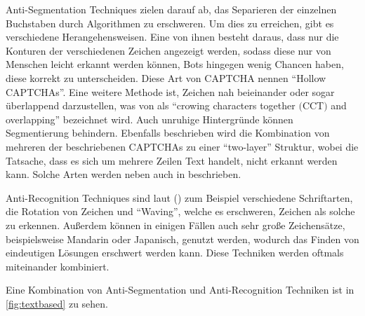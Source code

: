 Anti-Segmentation Techniques zielen darauf ab, das Separieren der einzelnen Buchstaben durch Algorithmen zu erschweren. 
Um dies zu erreichen, gibt es verschiedene Herangehensweisen.
Eine von ihnen besteht daraus, dass nur die Konturen der verschiedenen Zeichen angezeigt werden, sodass diese nur von Menschen leicht erkannt werden können,
Bots hingegen wenig Chancen haben, diese korrekt zu unterscheiden. Diese Art von CAPTCHA nennen \citeauthor{surveyofresearch} ``Hollow CAPTCHAs''. %
Eine weitere Methode ist, Zeichen nah beieinander oder sogar überlappend darzustellen, 
was von \citeauthor{surveyofresearch} als ``crowing characters together $($CCT$)$ and overlapping'' bezeichnet wird.
Auch unruhige Hintergründe können Segmentierung behindern.
Ebenfalls beschrieben wird die Kombination von mehreren der beschriebenen CAPTCHAs zu einer ``two-layer'' Struktur,
wobei die Tatsache, dass es sich um mehrere Zeilen Text handelt, nicht erkannt werden kann. 
Solche Arten werden neben \cite[p.76]{surveyofresearch} auch in \cite[p.132f]{Beheshti} beschrieben.

Anti-Recognition Techniques sind laut \citeauthor{surveyofresearch} (\cite[p.77]{surveyofresearch}) zum Beispiel verschiedene Schriftarten, die Rotation von Zeichen und ``Waving'', 
welche es erschweren, Zeichen als solche zu erkennen. 
Außerdem können in einigen Fällen auch sehr große Zeichensätze, beispielsweise Mandarin oder Japanisch, genutzt werden, 
wodurch das Finden von eindeutigen Lösungen erschwert werden kann.
Diese Techniken werden oftmals miteinander kombiniert.


Eine Kombination von Anti-Segmentation und Anti-Recognition Techniken ist in \autoref{fig:textbased} zu sehen.

